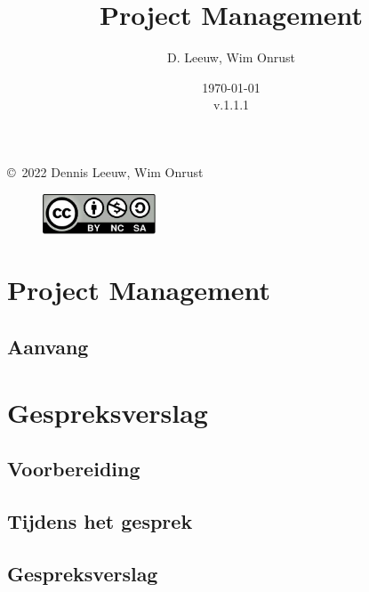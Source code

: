 \documentclass[a4paper,12pt,twoside,openright,titlepage]{book}
\author{D. Leeuw, Wim Onrust}
\title{Project Management}
\date{\today\\v.1.1.1}
\begin{document}

\maketitle

\copyright\ 2022 Dennis Leeuw, Wim Onrust\\

\begin{figure}
\includegraphics[width=0.3\textwidth]{CC-BY-SA-NC.png}
\end{figure}

\bigskip




\frontmatter
%
%

\tableofcontents

\mainmatter

\chapter{Project Management}

\section{Aanvang}


\chapter{Gespreksverslag}

\section{Voorbereiding}

\section{Tijdens het gesprek}

\section{Gespreksverslag}

\end{document}
